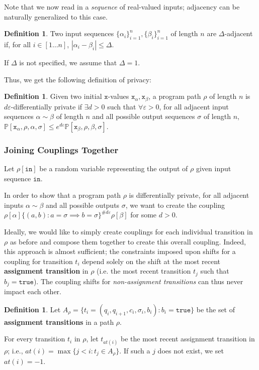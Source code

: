 \documentclass[12pt]{article}
\newcommand{\PP}{\mathbb{P}}
\theoremstyle{definition}
\newtheorem{defn}[thm]{Definition}
\begin{document}
Note that we now read in a \textit{sequence} of real-valued inputs; adjacency can be naturally generalized to this case.

\begin{defn}
    Two input sequences $\{\alpha_i\}_{i=1}^n, \{\beta_i\}_{i=1}^n$ of length $n$ are $\Delta$-adjacent if, for all $i\in [1\ldots n]$, $|\alpha_i-\beta_i|\leq \Delta$. 

    If $\Delta$ is not specified, we assume that $\Delta = 1$. 
\end{defn}

Thus, we get the following definition of privacy:

\begin{defn}
    Given two initial $\texttt{x}$-values $\texttt{x}_\alpha, \texttt{x}_\beta$, a program path $\rho$ of length $n$ is $d\varepsilon$-differentially private if $\exists d>0$ such that $\forall \varepsilon>0$, for all adjacent input sequences $\alpha\sim \beta$ of length $n$ and all possible output sequences $\sigma$ of length $n$, $\PP[\texttt{x}_\alpha, \rho, \alpha, \sigma]\leq e^{d\varepsilon}\PP[\texttt{x}_\beta, \rho, \beta, \sigma]$.
\end{defn}

\subsubsection{Joining Couplings Together}

Let $\rho[\texttt{in}]$ be a random variable representing the output of $\rho$ given input sequence $\texttt{in}$. 

In order to show that a program path $\rho$ is differentially private, for all adjacent inputs $\alpha\sim\beta$ and all possible outputs $\sigma$, we want to create the coupling $\rho[\alpha]\{(a, b): a=\sigma\implies b=\sigma\}^{\#d\varepsilon}\rho[\beta]$ for some $d>0$. 

Ideally, we would like to simply create couplings for each individual transition in $\rho$ as before and compose them together to create this overall coupling. Indeed, this approach is almost sufficient; the constraints imposed upon shifts for a coupling for transition $t_i$ depend solely on the shift at the most recent \textbf{assignment transition} in $\rho$ (i.e. the most recent transition $t_j$ such that $b_j = \texttt{true}$). 
The coupling shifts for \textit{non-assignment transitions} can thus never impact each other. 

\begin{defn}
    Let $A_\rho = \{t_i=(q_i, q_{i+1}, c_i, \sigma_i, b_i): b_i = \texttt{true}\}$ be the set of \textbf{assignment transitions} in a path $\rho$. 

    For every transition $t_i$ in $\rho$, let $t_{at(i)}$ be the most recent assignment transition in $\rho$; i.e., $at(i) = \max\{j<i: t_j\in A_\rho\}$. If such a $j$ does not exist, we set $at(i)=-1$. 
\end{defn}
\end{document}
